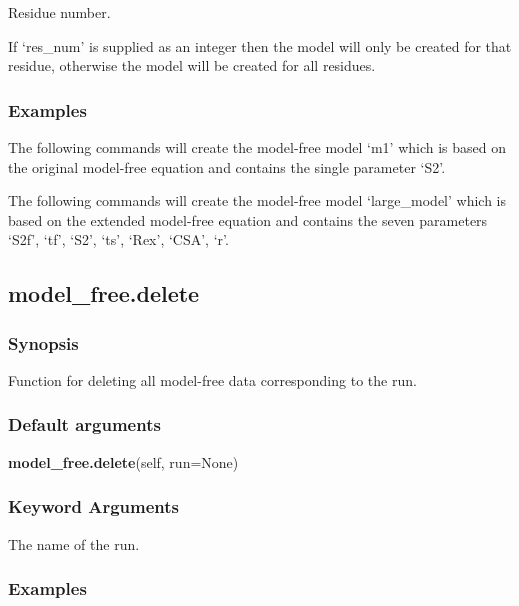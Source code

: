 Residue number.

If `res\_num' is supplied as an integer then the model will only be created for that residue,
otherwise the model will be created for all residues.


\subsubsection{Examples}

The following commands will create the model-free model `m1' which is based on the original
model-free equation and contains the single parameter `S2'.



The following commands will create the model-free model `large\_model' which is based on the
extended model-free equation and contains the seven parameters `S2f', `tf', `S2', `ts',
`Rex', `CSA', `r'.




\newpage

\subsection{model\_free.delete}


\subsubsection{Synopsis}

Function for deleting all model-free data corresponding to the run.

\subsubsection{Default arguments}

\textsf{\textbf{model\_free.delete}(self, run=None)}


\subsubsection{Keyword Arguments}

  The name of the run.

\subsubsection{Examples}

